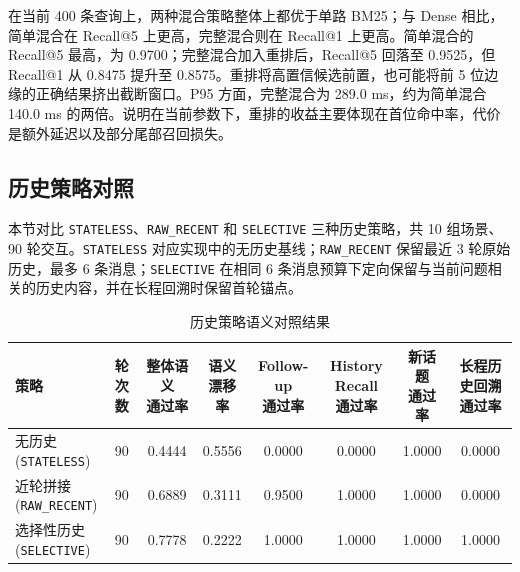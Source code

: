 在当前 400 条查询上，两种混合策略整体上都优于单路 BM25；与 Dense 相比，简单混合在 Recall@5 上更高，完整混合则在 Recall@1 上更高。简单混合的 Recall@5 最高，为 0.9700；完整混合加入重排后，Recall@5 回落至 0.9525，但 Recall@1 从 0.8475 提升至 0.8575。重排将高置信候选前置，也可能将前 5 位边缘的正确结果挤出截断窗口。P95 方面，完整混合为 289.0 ms，约为简单混合 140.0 ms 的两倍。说明在当前参数下，重排的收益主要体现在首位命中率，代价是额外延迟以及部分尾部召回损失。

\subsection{历史策略对照}

本节对比 \texttt{STATELESS}、\texttt{RAW\_RECENT} 和 \texttt{SELECTIVE} 三种历史策略，共 10 组场景、90 轮交互。\texttt{STATELESS} 对应实现中的无历史基线；\texttt{RAW\_RECENT} 保留最近 3 轮原始历史，最多 6 条消息；\texttt{SELECTIVE} 在相同 6 条消息预算下定向保留与当前问题相关的历史内容，并在长程回溯时保留首轮锚点。

\begin{table}[H]
    \centering
    \caption{历史策略语义对照结果}
    \label{tab:history-strategy-ablation-result}
    {\footnotesize
    \begin{adjustbox}{max width=\textwidth}
    \begin{tabular}{lccccccc}
        \toprule
        策略 & 轮次数 & \makecell[c]{整体语义\\通过率} & \makecell[c]{语义\\漂移率} & \makecell[c]{Follow-up\\通过率} & \makecell[c]{History Recall\\通过率} & \makecell[c]{新话题\\通过率} & \makecell[c]{长程历史回溯\\通过率} \\
        \midrule
        \makecell[l]{无历史\\(\texttt{STATELESS})} & 90 & 0.4444 & 0.5556 & 0.0000 & 0.0000 & 1.0000 & 0.0000 \\
        \makecell[l]{近轮拼接\\(\texttt{RAW\_RECENT})} & 90 & 0.6889 & 0.3111 & 0.9500 & 1.0000 & 1.0000 & 0.0000 \\
        \makecell[l]{选择性历史\\(\texttt{SELECTIVE})} & 90 & 0.7778 & 0.2222 & 1.0000 & 1.0000 & 1.0000 & 1.0000 \\
        \bottomrule
    \end{tabular}
    \end{adjustbox}
    }
\end{table}


